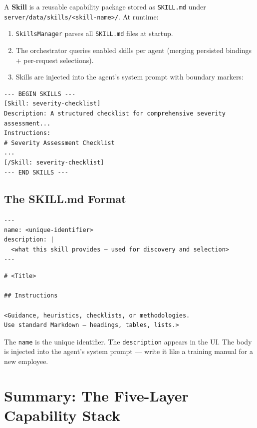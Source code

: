 \documentclass[
  paper=a4,
  fontsize=10pt,
  DIV=14,
  headings=normal,
  headsepline=true,
  parskip=half,
]{scrartcl}
\newcommand{\code}[1]{\lstinline[basicstyle=\ttfamily\small,breaklines=false]|#1|}
\begin{document}
A \textbf{Skill} is a reusable capability package stored as \code{SKILL.md} under \texttt{server/data/skills/<skill-name>/}. At runtime:

\begin{enumerate}
  \item \code{SkillsManager} parses all \code{SKILL.md} files at startup.
  \item The orchestrator queries enabled skills per agent (merging persisted bindings + per-request selections).
  \item Skills are injected into the agent's system prompt with boundary markers:
\end{enumerate}

\begin{verbatim}
--- BEGIN SKILLS ---
[Skill: severity-checklist]
Description: A structured checklist for comprehensive severity assessment...
Instructions:
# Severity Assessment Checklist
...
[/Skill: severity-checklist]
--- END SKILLS ---
\end{verbatim}

\subsection{The SKILL.md Format}

\begin{verbatim}
---
name: <unique-identifier>
description: |
  <what this skill provides — used for discovery and selection>
---
\end{verbatim}

\begin{verbatim}
# <Title>

## Instructions

<Guidance, heuristics, checklists, or methodologies.
Use standard Markdown — headings, tables, lists.>
\end{verbatim}

The \code{name} is the unique identifier. The \code{description} appears in the UI. The body is injected into the agent's system prompt — write it like a training manual for a new employee.

\section{Summary: The Five-Layer Capability Stack}
\end{document}

